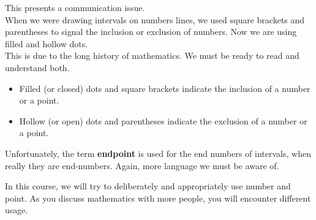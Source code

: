 \documentclass{ximera}
\begin{document}
This presents a communication issue.  \\


When we were drawing intervals on numbers lines, we used square brackets and parentheses to signal the inclusion or exclusion of numbers.  Now we are using filled and hollow dots. \\

This is due to the long history of mathematics.  We must be ready to read and understand both.


\begin{itemize}
\item Filled (or closed) dots and square brackets indicate the inclusion of a number or a point.
\item Hollow (or open) dots and parentheses indicate the exclusion of a number or a point.
\end{itemize}

Unfortunately, the term \textbf{endpoint} is used for the end numbers of intervals, when really they are end-numbers. Again, more language we must be aware of.

In this course, we will try to deliberately and appropriately use number and point.  As you discuss mathematics with more people, you will encounter different usage.
\end{document}
